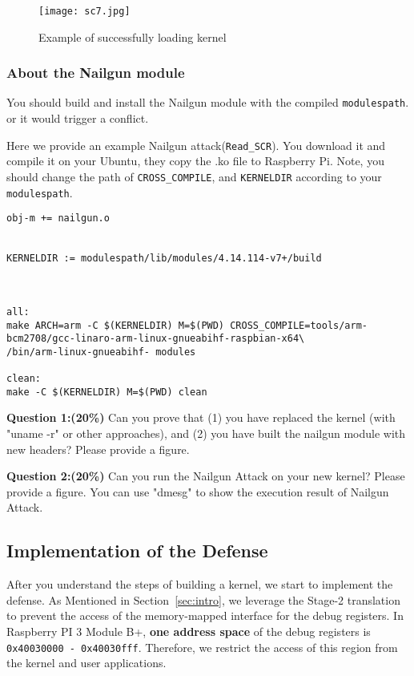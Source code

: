 \begin{figure}[H]
	\centering
	\texttt{[image: sc7.jpg]}
	\caption{Example of successfully loading kernel}
\end{figure}



\subsubsection{About the Nailgun module}
You should build and install the Nailgun module with the compiled 
\texttt{modulespath}. or it would trigger a conflict.

Here we provide an example Nailgun attack(\texttt{Read\_SCR}). You 
download it 
and compile it on your Ubuntu, they copy the .ko file to Raspberry Pi.
Note, you should change the path of \texttt{CROSS\_COMPILE}, and 
\texttt{KERNELDIR} according to your \texttt{modulespath}.


\begin{lstlisting}
obj-m += nailgun.o


KERNELDIR := modulespath/lib/modules/4.14.114-v7+/build



all:
make ARCH=arm -C $(KERNELDIR) M=$(PWD) CROSS_COMPILE=tools/arm-bcm2708/gcc-linaro-arm-linux-gnueabihf-raspbian-x64\
/bin/arm-linux-gnueabihf- modules

clean:
make -C $(KERNELDIR) M=$(PWD) clean
\end{lstlisting}

\textbf{Question 1:(\textbf{20\%})} Can you prove that (1) you have 
replaced the 
kernel (with "uname -r" or other approaches), and (2) you have built 
the nailgun module with new headers? Please provide a figure. 


\textbf{Question 2:(\textbf{20\%})} Can you run the Nailgun Attack on 
your new 
kernel? Please provide a figure. You can use "dmesg" to show the 
execution result of Nailgun Attack. 

\subsection{Implementation of the Defense}

After you understand the steps of building a kernel, we start to 
implement the defense. As Mentioned in Section~\ref{sec:intro}, we 
leverage the Stage-2 translation to prevent the access of the 
memory-mapped interface for the debug registers. In Raspberry PI 3 
Module B+, \textbf{one address space} of the debug registers is 
\texttt{0x40030000 - 0x40030fff}.
Therefore, we restrict the access of this region from the kernel and 
user applications.


